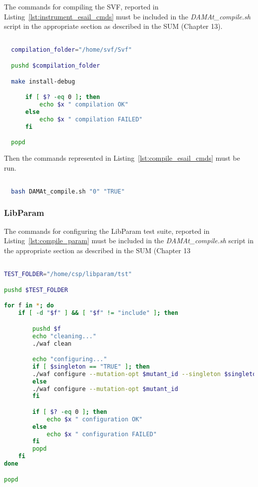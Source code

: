 The commands for compiling the SVF, reported in Listing~\ref{lst:instrument_esail_cmds} must be included in the \emph{DAMAt\_compile.sh} script in the appropriate section as described in the SUM (Chapter 13).


  \begin{lstlisting}[language=bash, label={lst:compile_esail}]

  compilation_folder="/home/svf/Svf"

  pushd $compilation_folder

  make install-debug

      if [ $? -eq 0 ]; then
          echo $x " compilation OK"
      else
          echo $x " compilation FAILED"
      fi

  popd

  \end{lstlisting}

Then the commands represented in Listing~\ref{lst:compile_esail_cmds} must be run.

  \begin{lstlisting}[language=bash, label={lst:compile_esail_cmds}]

  bash DAMAt_compile.sh "0" "TRUE"

  \end{lstlisting}

\subsubsection{LibParam}

The commands for configuring the LibParam test suite, reported in Listing~\ref{lst:compile_param} must be included in the \emph{DAMAt\_compile.sh} script in the appropriate section as described in the SUM (Chapter 13


\begin{lstlisting}[language=bash, label={lst:compile_param}]

TEST_FOLDER="/home/csp/libparam/tst"

pushd $TEST_FOLDER

for f in *; do
    if [ -d "$f" ] && [ "$f" != "include" ]; then

        pushd $f
        echo "cleaning..."
        ./waf clean

        echo "configuring..."
        if [ $singleton == "TRUE" ]; then
        ./waf configure --mutation-opt $mutant_id --singleton $singleton
        else
        ./waf configure --mutation-opt $mutant_id
        fi

        if [ $? -eq 0 ]; then
            echo $x " configuration OK"
        else
            echo $x " configuration FAILED"
        fi
        popd
    fi
done

popd

\end{lstlisting}


